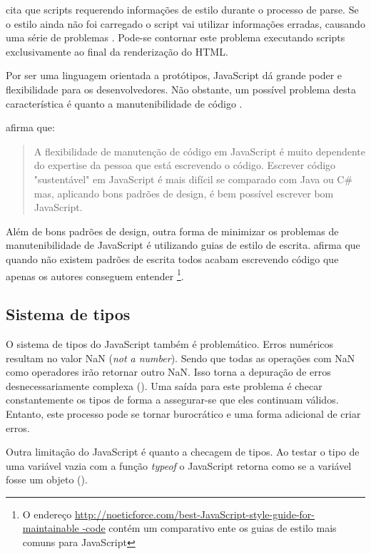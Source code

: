 \citet{howBrowsersWork} cita que scripts requerendo informações de
estilo durante o processo de parse. Se o estilo ainda não foi carregado
o script vai utilizar informações erradas, causando uma série de
problemas . Pode-se
contornar este problema executando scripts exclusivamente ao final da
renderização do HTML.

Por ser uma linguagem orientada a protótipos, JavaScript dá grande
poder e flexibilidade para os desenvolvedores. Não obstante, um
possível problema desta característica é quanto a manutenibilidade de
código .

\citet{html5Tradeoffs} afirma que:
\begin{quote}
A flexibilidade de manutenção de código em JavaScript é muito
dependente do expertise da pessoa que está escrevendo o código.
Escrever código "sustentável" em JavaScript é mais difícil se
comparado com Java ou C\# mas, aplicando bons padrões de design, é bem
possível escrever bom JavaScript.
\end{quote}

Além de bons padrões de design, outra forma de minimizar os
problemas de manutenibilidade de JavaScript é utilizando guias
de estilo de escrita. \citet{jsStyleGuide} afirma que quando
não existem padrões de escrita todos acabam escrevendo código
que apenas os autores conseguem entender \footnote{O endereço
\url{http://noeticforce.com/best-JavaScript-style-guide-for-maintainable
-code} contém um comparativo ente os guias de estilo mais comuns para
JavaScript}.

\subsection{Sistema de tipos}

O sistema de tipos do JavaScript também é problemático. Erros
numéricos resultam no valor NaN (\textit{not a number}). Sendo que
todas as operações com NaN como operadores irão retornar outro
NaN. Isso torna a depuração de erros desnecessariamente complexa
\autocite{html5mostwanted} (). Uma saída
para este problema é checar constantemente os tipos de forma a
assegurar-se que eles continuam válidos. Entanto, este processo
pode se tornar burocrático e uma forma adicional de criar erros.

Outra limitação do JavaScript é quanto a checagem de tipos. Ao
testar o tipo de uma variável vazia com a função \textit{typeof}
o JavaScript retorna como se a variável fosse um objeto
().

